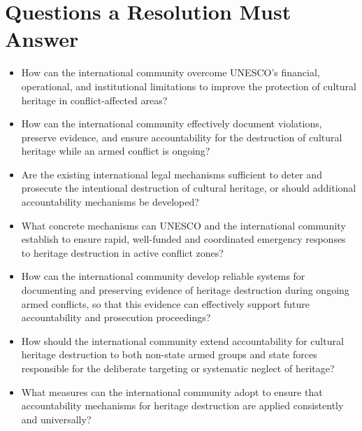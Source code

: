 \section{Questions a Resolution Must Answer}

\begin{itemize}
  \item How can the international community overcome UNESCO's financial, operational, and institutional limitations to improve the protection of cultural heritage in conflict-affected areas?
  \item How can the international community effectively document violations, preserve evidence, and ensure accountability for the destruction of cultural heritage while an armed conflict is ongoing?
  \item Are the existing international legal mechanisms sufficient to deter and prosecute the intentional destruction of cultural heritage, or should additional accountability mechanisms be developed?
  \item What concrete mechanisms can UNESCO and the international community establish to ensure rapid, well-funded and coordinated emergency responses to heritage destruction in active conflict zones?
  \item How can the international community develop reliable systems for documenting and preserving evidence of heritage destruction during ongoing armed conflicts, so that this evidence can effectively support future accountability and prosecution proceedings?
  \item How should the international community extend accountability for cultural heritage destruction to both non-state armed groups and state forces responsible for the deliberate targeting or systematic neglect of heritage?
  \item What measures can the international community adopt to ensure that accountability mechanisms for heritage destruction are applied consistently and universally?
\end{itemize}
